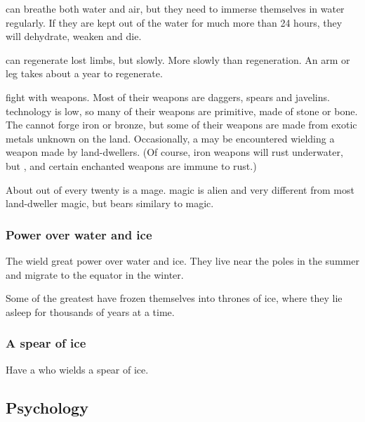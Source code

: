 \Nagae{} can breathe both water and air, but they need to immerse themselves in water regularly. 
If they are kept out of the water for much more than 24 hours, they will dehydrate, weaken and die. 

\Nagae{} can regenerate lost limbs, but slowly. 
More slowly than \meccaran{} regeneration. 
An arm or leg takes about a year to regenerate. 

\Nagae{} fight with weapons. 
Most of their weapons are daggers, spears and javelins. 
\Naga{} technology is low, so many of their weapons are primitive, made of stone or bone. 
The \nagae{} cannot forge iron or bronze, but some of their weapons are made from exotic metals unknown on the land. 
Occasionally, a \naga{} may be encountered wielding a weapon made by land-dwellers. 
(Of course, iron weapons will rust underwater, but \dragonsteel, \truesilver{} and certain enchanted weapons are immune to rust.) 

About \naga{} out of every twenty is a mage. 
\Naga{} magic is alien and very different from most land-dweller magic, but bears similary to \draconic{} magic. 





\subsubsection{Power over water and ice}
The \nagae{} wield great power over water and ice. They live near the poles in the summer and migrate to the equator in the winter. 

Some of the greatest \nagalords{} have frozen themselves into thrones of ice, where they lie asleep for thousands of years at a time. 





\subsubsection{A spear of ice}
Have a \naga{} who wields a spear of ice. 








\subsection{Psychology}







